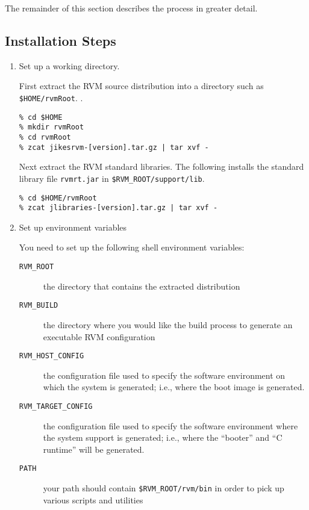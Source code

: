 The remainder of this section describes the process in greater detail.

\subsection{Installation Steps}

\begin{enumerate}
\item Set up a working directory.

First extract the RVM source distribution into a directory such as 
{\tt \$HOME/rvmRoot}.
.
\begin{verbatim}
% cd $HOME
% mkdir rvmRoot
% cd rvmRoot
% zcat jikesrvm-[version].tar.gz | tar xvf - 
\end{verbatim}

Next extract the RVM standard libraries.  The following installs the
standard library file {\tt rvmrt.jar} in {\tt \$RVM\_ROOT/support/lib}.
\begin{verbatim}
% cd $HOME/rvmRoot
% zcat jlibraries-[version].tar.gz | tar xvf - 
\end{verbatim}

\item Set up environment variables

You need to set up the following shell environment variables:

\begin{description}
\item [{\tt RVM\_ROOT}] the directory that contains the extracted
distribution 
\item [{\tt RVM\_BUILD}] the directory where you would like the build
process to generate an executable RVM configuration

\item [{\tt RVM\_HOST\_CONFIG}] the configuration file used to specify
the software environment on which the system is generated; i.e., where the
boot image is generated.

\item [{\tt RVM\_TARGET\_CONFIG}] the configuration file used to specify
the software environment where the system support is generated; i.e., where
the ``booter'' and ``C runtime'' will be generated.

\item[{\tt PATH}] your path should contain {\tt \$RVM\_ROOT/rvm/bin} in
order to pick up various scripts and utilities
\end{description}


\end{enumerate}
